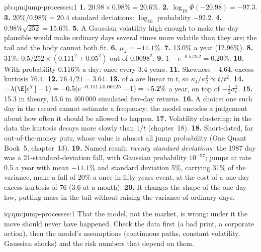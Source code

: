 \begin{solution}{pb:qm:jump-processes:1}
\textbf{1.} $20.98 \times 0.98\% = 20.6\%$.
\textbf{2.} $\log_{10}\Phi(-20.98) = -97.3$.
\textbf{3.} $20\%/0.98\% = 20.4$ standard deviations: $\log_{10}$ probability $-92.2$.
\textbf{4.} $0.98\%\sqrt{252} = 15.6\%$.
\textbf{5.} A Gaussian volatility high enough to make the day plausible would make ordinary days
several times more volatile than they are; the tail and the body cannot both fit.
\textbf{6.} $\mu_J = -11.1\%$.
\textbf{7.} 13.0\% a year (12.96\%).
\textbf{8.} 31\%: $0.5/252 \times (0.111^2 + 0.05^2)$ out of $0.0098^2$.
\textbf{9.} $1 - e^{-0.5/252} = 0.20\%$.
\textbf{10.} With probability 0.116\% a day: once every 3.4 years.
\textbf{11.} Skewness $-4.64$, excess kurtosis 76.4.
\textbf{12.} $76.4/21 = 3.64$.
\textbf{13.}  of a  are linear in $t$, so $\kappa_4/\kappa_2^2 \propto t/t^2$.
\textbf{14.} $-\lambda(\E[e^Y] - 1) = -0.5(e^{-0.111 + 0.00125} - 1) = +5.2\%$ a year, on top of $-\tfrac12\sigma_c^2$.
\textbf{15.} 15.3 in theory, 15.6 in 400\,000 simulated five-day returns.
\textbf{16.} A choice: one such day in the record cannot estimate a frequency; the model encodes a
judgement about how often it should be allowed to happen.
\textbf{17.} Volatility clustering: in the data the kurtosis decays more slowly than $1/t$ (chapter~18).
\textbf{18.} Short-dated, far out-of-the-money puts, whose value is almost all jump probability (One
Quant Book~5, chapter~13).
\textbf{19.} Named result: \emph{twenty standard deviations}: the 1987 day was a 21-standard-deviation
fall, with Gaussian probability $10^{-97}$; jumps at rate 0.5 a year with mean $-11.1\%$ and standard
deviation 5\%, carrying 31\% of the variance, make a fall of 20\% a once-in-fifty-years event, at the
cost of a one-day excess kurtosis of 76 (3.6 at a month).
\textbf{20.} It changes the shape of the one-day law, putting mass in the tail without raising the
variance of ordinary days.
\end{solution}

\begin{solution}{iq:qm:jump-processes:1}
That the model, not the market, is wrong: under it the move should never have happened. Check the data
first (a bad print, a corporate action), then the model's assumptions (continuous paths, constant
volatility, Gaussian shocks) and the risk numbers that depend on them.
\end{solution}

